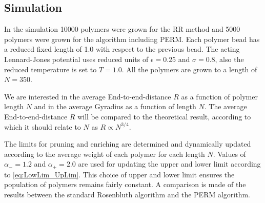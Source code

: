 \subsection*{Simulation}
In the simulation 10000 polymers were grown for the RR method and 5000 polymers were grown for the algorithm including PERM. Each polymer bead has a reduced fixed length of 1.0 with respect to the previous bead. The acting Lennard-Jones potential uses reduced units of $\epsilon=0.25$ and $\sigma=0.8$, also the reduced temperature is set to $T=1.0$. All the polymers are grown to a length of $N=350$. 

We are interested in the average End-to-end-distance $R$ as a function of polymer length $N$ and in the average Gyradius as a function of length $N$. The average End-to-end-distance $R$ will be compared to the theoretical result, according to which it should relate to $N$ as $R\propto N^{3/4}$.

The limits for pruning and enriching are determined and dynamically updated according to the average weight of each polymer for each length $N$. Values of $\alpha_-=1.2$ and $\alpha_+=2.0$ are used for updating the upper and lower limit according to \eqref{eq:LowLim_UpLim}. This choice of upper and lower limit ensures the population of polymers remains fairly constant. A comparison is made of the results between the standard Rosenbluth algorithm and the PERM algorithm.
